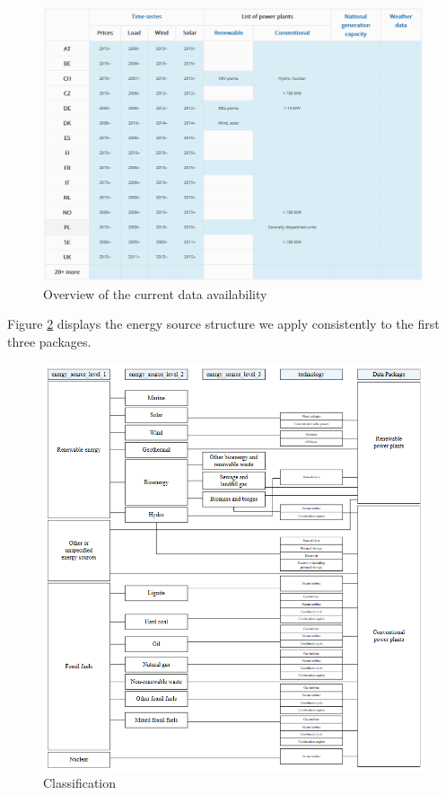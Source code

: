 \documentclass[article]{elsarticle}
\begin{document}
\begin{figure}[!h]
    \centering
    \includegraphics[width=1\textwidth]{figures/data_availability_overview.PNG}
    \caption{Overview of the current data availability}
    \label{fig:overview}
\end{figure}

Figure \ref{fig:energy_structure} displays the energy source structure we apply consistently to the first three packages.
\begin{figure}[!h]
    \centering
    \includegraphics[width=1\textwidth]{figures/energy_source_tree.PNG}
    \caption{Classification}
    \label{fig:energy_structure}
\end{figure}
\end{document}

